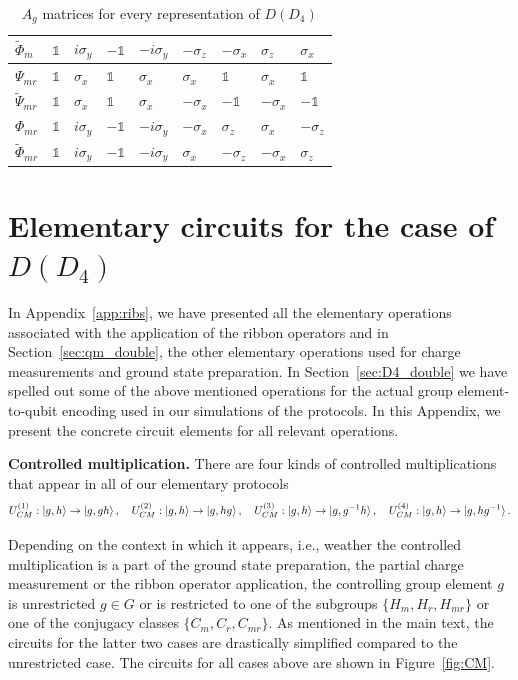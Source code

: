 \documentclass[a4paper,twocolumn,11pt]{quantumarticle}
\begin{document}
\begin{table}[]
\begin{tabular}{|l||l|l|l|l|l|l|l|l|}
 $\tilde{\Phi}_{m}$ &$\mathbb{1}$&$i\sigma_y$ &$-\mathbb{1}$& $-i\sigma_y$ &$-\sigma_z$ &$-\sigma_x$ &  $\sigma_z$ &   $\sigma_x$ \\\hline
$\Psi_{mr}$ &$\mathbb{1}$&  $\sigma_x$ & $\mathbb{1}$&  $\sigma_x$ & $\sigma_x$ & $\mathbb{1}$&  $\sigma_x$ &   $\mathbb{1}$\\\hline
$\tilde{\Psi}_{mr}$ &$\mathbb{1}$&  $\sigma_x$ & $\mathbb{1}$&  $\sigma_x$ &$-\sigma_x$ &$-\mathbb{1}$& $-\sigma_x$ &  $-\mathbb{1}$\\\hline
$\Phi_{mr}$ &$\mathbb{1}$&$i\sigma_y$ &$-\mathbb{1}$& $-i\sigma_y$ &$-\sigma_x$ & $\sigma_z$ &  $\sigma_x$ &  $-\sigma_z$ \\\hline
$\tilde{\Phi}_{mr}$ &$\mathbb{1}$&$i\sigma_y$ &$-\mathbb{1}$& $-i\sigma_y$ & $\sigma_x$ &$-\sigma_z$ & $-\sigma_x$ &   $\sigma_z$ \\\hline
\end{tabular}
    \caption{$A_g$ matrices for every representation of $D(D_4)$}
    \label{tab:reps}
\end{table}




\section{Elementary circuits for the case of $D(D_4)$}\label{app:cirqs}

In Appendix~\ref{app:ribs}, we have presented all the elementary operations associated with the application of the ribbon operators and in Section~\ref{sec:qm_double}, the other elementary operations used for charge measurements and ground state preparation.
In Section~\ref{sec:D4_double} we have spelled out some of the above mentioned operations for the actual group element-to-qubit encoding used in our simulations of the protocols. In this Appendix, we present the concrete circuit elements for all relevant operations.

\textbf{Controlled multiplication.} 
There are four kinds of controlled multiplications that appear in all of our elementary protocols
\begin{equation}\label{eq:circs}
U_{CM}^{(1)}: \ket{g,h} \rightarrow \ket{g, gh}, \quad
U_{CM}^{(2)}: \ket{g,h} \rightarrow \ket{g, hg}, \quad
U_{CM}^{(3)}: \ket{g,h} \rightarrow \ket{g, g^{-1}h}, \quad
U_{CM}^{(4)}: \ket{g,h} \rightarrow \ket{g, hg^{-1}}.	
\end{equation}

Depending on the context in which it appears, i.e., weather the controlled multiplication is a part of the ground state preparation, the partial charge measurement or  the ribbon operator application, the controlling group element $g$ is unrestricted $g \in G$ or is restricted to one of the subgroups $\{H_m, H_r, H_{mr}\}$ or one of the conjugacy classes $\{C_m, C_r, C_{mr}\}$. As mentioned in the main text, the circuits for the latter two cases are drastically simplified compared to the unrestricted case. The circuits for all cases above are shown in Figure~\ref{fig:CM}.
\end{document}
